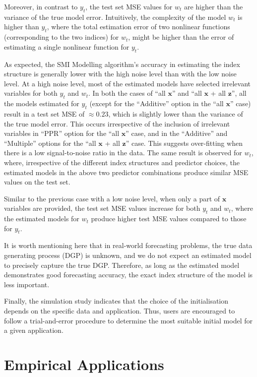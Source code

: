 \documentclass[
  11pt,
  a4paper,
]{article}
\begin{document}
Moreover, in contrast to \(y_{t}\), the test set MSE values for
\(w_{t}\) are higher than the variance of the true model error.
Intuitively, the complexity of the model \(w_{t}\) is higher than
\(y_{t}\), where the total estimation error of two nonlinear functions
(corresponding to the two indices) for \(w_{t}\), might be higher than
the error of estimating a single nonlinear function for \(y_{t}\).

As expected, the SMI Modelling algorithm's accuracy in estimating the
index structure is generally lower with the high noise level than with
the low noise level. At a high noise level, most of the estimated models
have selected irrelevant variables for both \(y_{t}\) and \(w_{t}\). In
both the cases of ``all \(\bm{x}\)'' and ``all \(\bm{x}\) + all
\(\bm{z}\)'', all the models estimated for \(y_{t}\) (except for the
``Additive'' option in the ``all \(\bm{x}\)'' case) result in a test set
MSE of \(\approx 0.23\), which is slightly lower than the variance of
the true model error. This occurs irrespective of the inclusion of
irrelevant variables in ``PPR'' option for the ``all \(\bm{x}\)'' case,
and in the ``Additive'' and ``Multiple'' options for the ``all
\(\bm{x}\) + all \(\bm{z}\)'' case. This suggests over-fitting when
there is a low signal-to-noise ratio in the data. The same result is
observed for \(w_{t}\), where, irrespective of the different index
structures and predictor choices, the estimated models in the above two
predictor combinations produce similar MSE values on the test set.

Similar to the previous case with a low noise level, when only a part of
\(\bm{x}\) variables are provided, the test set MSE values increase for
both \(y_{t}\) and \(w_{t}\), where the estimated models for \(w_{t}\)
produce higher test MSE values compared to those for \(y_{t}\).

It is worth mentioning here that in real-world forecasting problems, the
true data generating process (DGP) is unknown, and we do not expect an
estimated model to precisely capture the true DGP. Therefore, as long as
the estimated model demonstrates good forecasting accuracy, the exact
index structure of the model is less important.

Finally, the simulation study indicates that the choice of the
initialisation depends on the specific data and application. Thus, users
are encouraged to follow a trial-and-error procedure to determine the
most suitable initial model for a given application.

\section{Empirical Applications}\label{sec-application}
\end{document}
